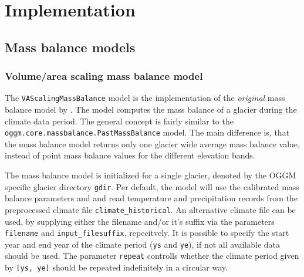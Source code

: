     


\section{Implementation} %
\label{sec:implementation}

    \subsection{Mass balance models} %
    \label{sub:mass_balance_models_implementation}

        \subsubsection{Volume/area scaling mass balance model} %
        \label{ssub:volume_area_scaling_mass_balance_model_implementation}

            The \lstinline`VAScalingMassBalance` model is the implementation of the \textit{original} mass balance model by \citet{Marzeion2012b}. The model computes the mass balance of a glacier during the climate data period. The general concept is fairly similar to the \lstinline`oggm.core.massbalance.PastMassBalance` model. The main difference is, that the \vas{} mass balance model returns only one glacier wide average mass balance value, instead of point mass balance values for the different elevation bands.

            The mass balance model is initialized for a single glacier, denoted by the OGGM specific glacier directory \lstinline`gdir`. Per default, the model will use the calibrated mass balance parameters \mustar{} and \bias{} and read temperature and precipitation records from the preprocessed climate file \lstinline`climate_historical`. An alternative climate file can be used, by supplying either the filename and/or it's suffix via the parameters \lstinline`filename` and \lstinline`input_filesuffix`, repecitvely. It is possible to specify the start year and end year of the climate period (\lstinline`ys` and \lstinline`ye`), if not all available data should be used. The parameter \lstinline`repeat` controlls whether the climate period given by \lstinline`[ys, ye]` should be repeated indefinitely in a circular way.

